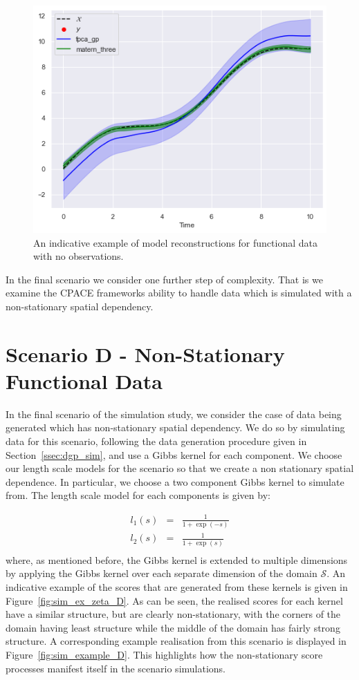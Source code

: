\begin{figure}
	\centering
	\includegraphics[width=\textwidth]{sim_test_recon_C}
	\caption{An indicative example of model reconstructions for functional data with  no observations.}
	\label{fig:sim_test_recon_C}
\end{figure}

In the final scenario we consider one further step of complexity.
That is we examine the CPACE frameworks ability to handle data which is simulated with a non-stationary spatial dependency. 

\section{Scenario D - Non-Stationary Functional Data \label{sec:sim_D}}
In the final scenario of the simulation study, we consider the case of data being generated which has non-stationary spatial dependency.
We do so by simulating data for this scenario, following the data generation procedure given in Section~\ref{ssec:dgp_sim}, and use a Gibbs kernel for each component.
We choose our length scale models for the scenario so that we create a non stationary spatial dependence.
In particular, we choose a two component Gibbs kernel to simulate from. 
The length scale model for each components is given by:

\begin{eqnarray}
	l_1(s) &=& \frac{1}{1 + \exp(-s)} \nonumber \\
	l_2(s) &=& \frac{1}{1 +  \exp(s)} \nonumber \\
\end{eqnarray}
where, as mentioned before, the Gibbs kernel is extended to multiple dimensions by applying the Gibbs kernel over each separate dimension of the domain $\mathcal{S}$. 
An indicative example of the scores that are generated from these kernels is given in Figure~\ref{fig:sim_ex_zeta_D}. 
As can be seen, the realised scores for each kernel have a similar structure, but are clearly non-stationary, with the corners of the domain having least structure while the middle of the domain has fairly strong structure.
A corresponding example realisation from this scenario is displayed in Figure~\ref{fig:sim_example_D}.
This highlights how the non-stationary score processes manifest itself in the scenario simulations.

